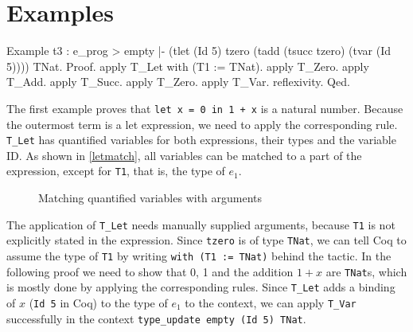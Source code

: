 \documentclass[fleqn]{scrreprt}
\newcommand{\coqinline}[1]{\texttt{#1}}
\begin{document}
\section{Examples}
\begin{coqcode}
Example t3 : e_prog > empty |- (tlet (Id 5) tzero 
                                     (tadd (tsucc tzero) 
                                           (tvar (Id 5)))) \in TNat.
Proof. 
  apply T_Let with (T1 := TNat).
  apply T_Zero.
  apply T_Add.
  apply T_Succ. apply T_Zero.
  apply T_Var. reflexivity.
Qed.
\end{coqcode}
The first example proves that \texttt{let x = 0 in 1 + x} is a natural number. Because the outermost term is a let expression, we need to apply the corresponding rule. \coqinline{T_Let} has quantified variables for both expressions, their types and the variable ID. As shown in \autoref{letmatch}, all variables can be matched to a part of the expression, except for \coqinline{T1}, that is, the type of $e_{1}$.
\begin{figure}[H]
	\caption{Matching quantified variables with arguments}
	\label{letmatch}
\end{figure}
The application of \coqinline{T_Let} needs manually supplied arguments, because \coqinline{T1} is not explicitly stated in the expression. Since \coqinline{tzero} is of type \coqinline{TNat}, we can tell Coq to assume the type of \coqinline{T1} by writing \coqinline{with (T1 := TNat)} behind the tactic. In the following proof we need to show that 0, 1 and the addition $1 + x$ are \coqinline{TNat}s, which is mostly done by applying the corresponding rules. Since \coqinline{T_Let} adds a binding of $x$ (\coqinline{Id 5} in Coq) to the type of $e_{1}$ to the context, we can apply \coqinline{T_Var} successfully in the context \coqinline{type_update empty (Id 5) TNat}.\\
\par 
\end{document}
